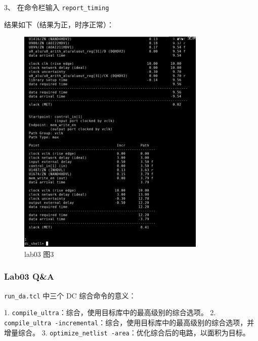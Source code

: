 3、	在命令栏输入 \texttt{report\_timing}


结果如下（结果为正，时序正常）：



\begin{figure}[H]
    \centering
    \includegraphics[width=0.8\textwidth]{images/lab03-03.png}
    \caption{lab03 图3}
\end{figure}

\subsubsection{Lab03 Q\&A}

\texttt{run\_da.tcl} 中三个 DC 综合命令的意义：

1. \texttt{compile\_ultra}：综合，使用目标库中的最高级别的综合选项。
2. \texttt{compile\_ultra -incremental}：综合，使用目标库中的最高级别的综合选项，并增量综合。
3. \texttt{optimize\_netlist -area}：优化综合后的电路，以面积为目标。

